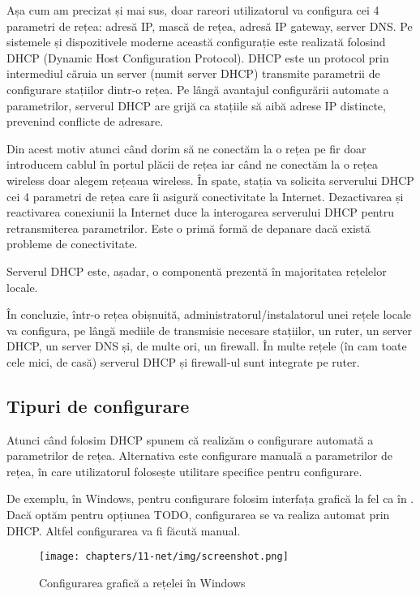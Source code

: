 Așa cum am precizat și mai sus, doar rareori utilizatorul va configura cei 4 parametri de rețea: adresă IP, mască de rețea, adresă IP gateway, server DNS. Pe sistemele și dispozitivele moderne această configurație este realizată folosind DHCP (Dynamic Host Configuration Protocol). DHCP este un protocol prin intermediul căruia un server (numit server DHCP) transmite parametrii de configurare stațiilor dintr-o rețea. Pe lângă avantajul configurării automate a parametrilor, serverul DHCP are grijă ca stațiile să aibă adrese IP distincte, prevenind conflicte de adresare.

Din acest motiv atunci când dorim să ne conectăm la o rețea pe fir doar introducem cablul în portul plăcii de rețea iar când ne conectăm la o rețea wireless doar alegem rețeaua wireless. În spate, stația va solicita serverului DHCP cei 4 parametri de rețea care îi asigură conectivitate la Internet. Dezactivarea și reactivarea conexiunii la Internet duce la interogarea serverului DHCP pentru retransmiterea parametrilor. Este o primă formă de depanare dacă există probleme de conectivitate.

Serverul DHCP este, așadar, o componentă prezentă în majoritatea rețelelor locale.

În concluzie, într-o rețea obișnuită, administratorul/instalatorul unei rețele locale va configura, pe lângă mediile de transmisie necesare stațiilor, un ruter, un server DHCP, un server DNS și, de multe ori, un firewall. În multe rețele (în cam toate cele mici, de casă) serverul DHCP și firewall-ul sunt integrate pe ruter.

\subsection{Tipuri de configurare}
\label{sec:net:config-types}

Atunci când folosim DHCP spunem că realizăm o configurare automată a parametrilor de rețea. Alternativa este configurare manuală a parametrilor de rețea, în care utilizatorul folosește utilitare specifice pentru configurare.

De exemplu, în Windows, pentru configurare folosim interfața grafică la fel ca în . Dacă optăm pentru opțiunea TODO, configurarea se va realiza automat prin DHCP. Altfel configurarea va fi făcută manual.

\begin{figure}[!htbp]
  \centering
  \texttt{[image: chapters/11-net/img/screenshot.png]}
  \caption{Configurarea grafică a rețelei în Windows}
  \label{fig:net:windows-config}
\end{figure}

